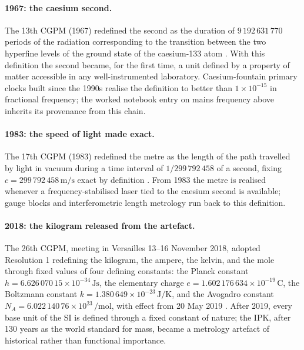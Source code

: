 \paragraph{1967: the caesium second.}

The 13th CGPM (1967) redefined the second as the duration of
$9\,192\,631\,770$ periods of the radiation corresponding to the
transition between the two hyperfine levels of the ground state of
the caesium-133 atom \cite{hist:ch01t3-cgpm13-1967}. With this
definition the second became, for the first time, a unit defined by
a property of matter accessible in any well-instrumented laboratory.
Caesium-fountain primary clocks built since the 1990s realise the
definition to better than $1 \times 10^{-15}$ in fractional
frequency; the worked notebook entry on mains frequency above
inherits its provenance from this chain.

\paragraph{1983: the speed of light made exact.}

The 17th CGPM (1983) redefined the metre as the length of the path
travelled by light in vacuum during a time interval of $1/299\,792\,
458$ of a second, fixing $c = 299\,792\,458 \,\si{\meter\per\second}$
exact by definition \cite{hist:ch01t3-cgpm17-1983}. From 1983 the
metre is realised whenever a frequency-stabilised laser tied to the
caesium second is available; gauge blocks and interferometric length
metrology run back to this definition.

\paragraph{2018: the kilogram released from the artefact.}

The 26th CGPM, meeting in Versailles 13--16 November 2018, adopted
Resolution 1 redefining the kilogram, the ampere, the kelvin, and the
mole through fixed values of four defining constants: the Planck
constant $h = 6.626\,070\,15 \times 10^{-34} \,\si{\joule\second}$,
the elementary charge $e = 1.602\,176\,634 \times 10^{-19}
\,\si{\coulomb}$, the Boltzmann constant $k = 1.380\,649 \times
10^{-23} \,\si{\joule\per\kelvin}$, and the Avogadro constant
$N_A = 6.022\,140\,76 \times 10^{23} \,\si{\per\mole}$, with effect
from 20 May 2019 \cite{hist:ch01t3-cgpm26-2018}. After 2019, every
base unit of the SI is defined through a fixed constant of nature;
the IPK, after 130 years as the world standard for mass, became a
metrology artefact of historical rather than functional importance.

